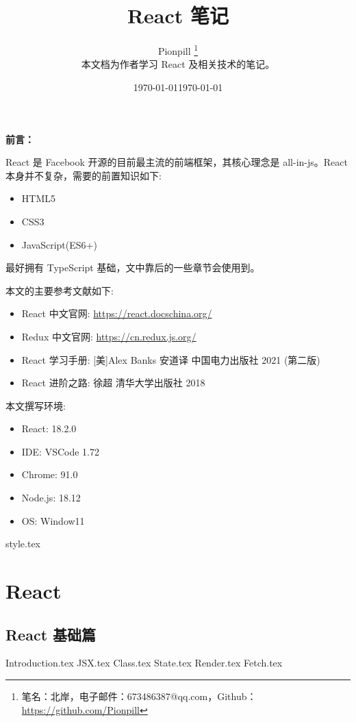 \documentclass{PionpillNote-book}
\title{React 笔记}
\author{
    Pionpill \footnote{笔名：北岸，电子邮件：673486387@qq.com，Github：\url{https://github.com/Pionpill}} \\
    本文档为作者学习 React 及相关技术的笔记。\\
}
\date{\today}
\begin{document}
\pagestyle{plain}
\maketitle

\noindent\textbf{前言：}

React 是 Facebook 开源的目前最主流的前端框架，其核心理念是 all-in-js。React 本身并不复杂，需要的前置知识如下:
\begin{itemize}
    \item HTML5
    \item CSS3
    \item JavaScript(ES6+)
\end{itemize}

最好拥有 TypeScript 基础，文中靠后的一些章节会使用到。

本文的主要参考文献如下:
\begin{itemize}
    \item React 中文官网: \url{https://react.docschina.org/}
    \item Redux 中文官网: \url{https://cn.redux.js.org/}
    \item React 学习手册: [美]Alex Banks 安道译 中国电力出版社 2021 (第二版)
    \item React 进阶之路: 徐超 清华大学出版社 2018
\end{itemize}

本文撰写环境:

\begin{itemize}
    \item React: 18.2.0
    \item IDE: VSCode 1.72 
    \item Chrome: 91.0
    \item Node.js: 18.12
    \item OS: Window11
\end{itemize}

\date{\today}
\newpage

\tableofcontents

\newpage

\setcounter{page}{1} 
\pagestyle{fancy}

{style.tex}
\part{React}
\chapter{React 基础篇}
{Introduction.tex}
{JSX.tex}
{Class.tex}
{State.tex}
{Render.tex}
{Fetch.tex}
\end{document}
